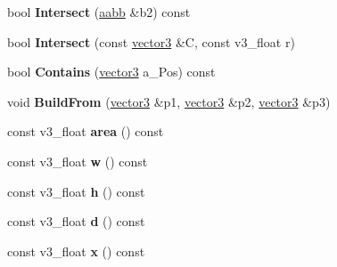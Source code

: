 \begin{DoxyCompactItemize}
\item 
bool {\bfseries Intersect} (\hyperlink{classns__phys_1_1aabb}{aabb} \&b2) const \hypertarget{classns__phys_1_1aabb_a7c94754663c1f53f0a4c9953e9d01a05}{}\label{classns__phys_1_1aabb_a7c94754663c1f53f0a4c9953e9d01a05}

\item 
bool {\bfseries Intersect} (const \hyperlink{classns__phys_1_1vector3}{vector3} \&C, const v3\+\_\+float r)\hypertarget{classns__phys_1_1aabb_aa30b8a9953782d57a23fcaa62e1a8b91}{}\label{classns__phys_1_1aabb_aa30b8a9953782d57a23fcaa62e1a8b91}

\item 
bool {\bfseries Contains} (\hyperlink{classns__phys_1_1vector3}{vector3} a\+\_\+\+Pos) const \hypertarget{classns__phys_1_1aabb_a3cdd470106310bc29b3580e04fafef5c}{}\label{classns__phys_1_1aabb_a3cdd470106310bc29b3580e04fafef5c}

\item 
void {\bfseries Build\+From} (\hyperlink{classns__phys_1_1vector3}{vector3} \&p1, \hyperlink{classns__phys_1_1vector3}{vector3} \&p2, \hyperlink{classns__phys_1_1vector3}{vector3} \&p3)\hypertarget{classns__phys_1_1aabb_ab9a719e28295c8f458a071e52fdeb5b4}{}\label{classns__phys_1_1aabb_ab9a719e28295c8f458a071e52fdeb5b4}

\item 
const v3\+\_\+float {\bfseries area} () const \hypertarget{classns__phys_1_1aabb_a7fcaabb4cd0395cd21eae49982cec555}{}\label{classns__phys_1_1aabb_a7fcaabb4cd0395cd21eae49982cec555}

\item 
const v3\+\_\+float {\bfseries w} () const \hypertarget{classns__phys_1_1aabb_ad94fc9d946f3eba5b8cd1753391e4f78}{}\label{classns__phys_1_1aabb_ad94fc9d946f3eba5b8cd1753391e4f78}

\item 
const v3\+\_\+float {\bfseries h} () const \hypertarget{classns__phys_1_1aabb_a184fb9c34f485eb620d8002d62af8420}{}\label{classns__phys_1_1aabb_a184fb9c34f485eb620d8002d62af8420}

\item 
const v3\+\_\+float {\bfseries d} () const \hypertarget{classns__phys_1_1aabb_a3668902dc0f1a66929a4b0ff41b6a667}{}\label{classns__phys_1_1aabb_a3668902dc0f1a66929a4b0ff41b6a667}

\item 
const v3\+\_\+float {\bfseries x} () const \hypertarget{classns__phys_1_1aabb_a195d71961fc0f5352022710e49ed0ed8}{}\label{classns__phys_1_1aabb_a195d71961fc0f5352022710e49ed0ed8}


\end{DoxyCompactItemize}
